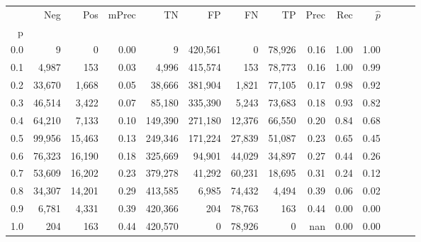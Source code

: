 \begin{tabular}{rrrrrrrrrrrrrr}
\toprule
{} &     Neg &     Pos & mPrec &       TN &       FP &      FN &      TP &  Prec &   Rec & $\hat{p}$ \\
p   &         &         &       &          &          &         &         &       &       &           \\
\midrule
0.0 &       9 &       0 &  0.00 &        9 &  420,561 &       0 &  78,926 &  0.16 &  1.00 &      1.00 \\
0.1 &   4,987 &     153 &  0.03 &    4,996 &  415,574 &     153 &  78,773 &  0.16 &  1.00 &      0.99 \\
0.2 &  33,670 &   1,668 &  0.05 &   38,666 &  381,904 &   1,821 &  77,105 &  0.17 &  0.98 &      0.92 \\
0.3 &  46,514 &   3,422 &  0.07 &   85,180 &  335,390 &   5,243 &  73,683 &  0.18 &  0.93 &      0.82 \\
0.4 &  64,210 &   7,133 &  0.10 &  149,390 &  271,180 &  12,376 &  66,550 &  0.20 &  0.84 &      0.68 \\
0.5 &  99,956 &  15,463 &  0.13 &  249,346 &  171,224 &  27,839 &  51,087 &  0.23 &  0.65 &      0.45 \\
0.6 &  76,323 &  16,190 &  0.18 &  325,669 &   94,901 &  44,029 &  34,897 &  0.27 &  0.44 &      0.26 \\
0.7 &  53,609 &  16,202 &  0.23 &  379,278 &   41,292 &  60,231 &  18,695 &  0.31 &  0.24 &      0.12 \\
0.8 &  34,307 &  14,201 &  0.29 &  413,585 &    6,985 &  74,432 &   4,494 &  0.39 &  0.06 &      0.02 \\
0.9 &   6,781 &   4,331 &  0.39 &  420,366 &      204 &  78,763 &     163 &  0.44 &  0.00 &      0.00 \\
1.0 &     204 &     163 &  0.44 &  420,570 &        0 &  78,926 &       0 &   nan &  0.00 &      0.00 \\
\bottomrule
\end{tabular}
